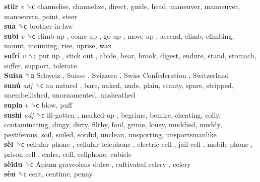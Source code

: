 \textbf{stür} \emph{v}  ␝ϲ  channelise, channelize, direct, guide, head, maneuver, manoeuver, manoeuvre, point, steer  \\
\textbf{sua} ␝ϲ   brother-in-law   \\
\textbf{subi} \emph{v}  ␝ϲ   climb up ,  come up ,  go up ,  move up , ascend, climb, climbing, mount, mounting, rise, uprise, wax  \\
\textbf{sufri} \emph{v}  ␝ϲ   put up ,  stick out , abide, bear, brook, digest, endure, stand, stomach, suffer, support, tolerate  \\
\textbf{Suisa} ␝α   Schweiz ,  Suisse ,  Svizzera ,  Swiss Confederation ,  Switzerland   \\
\textbf{sunú} \emph{adj}  ␝ϲ   au naturel , bare, naked, nude, plain, scanty, spare, stripped, unembellished, unornamented, unsheathed  \\
\textbf{supla} \emph{v}  ␝ϲ  blow, puff  \\
\textbf{sushi} \emph{adj}  ␝ϲ   ill-gotten ,  marked-up , begrime, bemire, cheating, colly, contaminating, dingy, dirty, filthy, foul, grime, lousy, muddied, muddy, pestiferous, soil, soiled, sordid, unclean, unsporting, unsportsmanlike  \\
\textbf{sèl} ␝ϲ   cellular phone ,  cellular telephone ,  electric cell ,  jail cell ,  mobile phone ,  prison cell , cadre, cell, cellphone, cubicle  \\
\textbf{sèldu} ␝ϲ   Apium graveolens dulce ,  cultivated celery , celery  \\
\textbf{sèn} ␝ϲ  cent, centime, penny  \\

